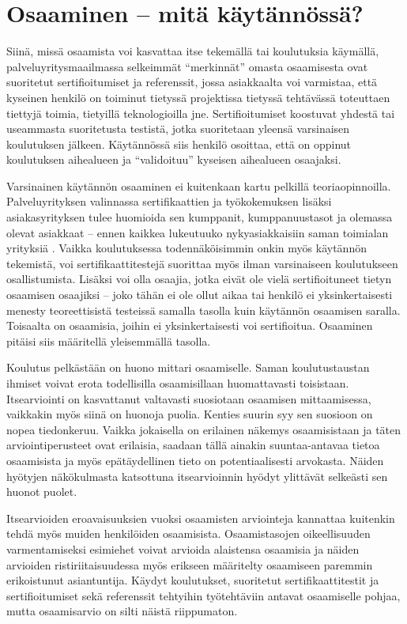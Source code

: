 \documentclass[a4paper,finnish,12pt]{article}
\begin{document}
\clearpage

\section{Osaaminen -- mitä käytännössä?}

Siinä, missä osaamista voi kasvattaa itse tekemällä tai koulutuksia käymällä, palveluyritysmaailmassa selkeimmät ``merkinnät'' omasta osaamisesta ovat suoritetut sertifioitumiset ja referenssit, jossa asiakkaalta voi varmistaa, että kyseinen henkilö on toiminut tietyssä projektissa tietyssä tehtävässä toteuttaen tiettyjä toimia, tietyillä teknologioilla jne. Sertifioitumiset koostuvat yhdestä tai useammasta suoritetusta testistä, jotka suoritetaan yleensä varsinaisen koulutuksen jälkeen. Käytännössä siis henkilö osoittaa, että on oppinut koulutuksen aihealueen ja ``validoituu'' kyseisen aihealueen osaajaksi.

Varsinainen käytännön osaaminen ei kuitenkaan kartu pelkillä teoriaopinnoilla. Palveluyrityksen valinnassa sertifikaattien ja työkokemuksen lisäksi asiakasyrityksen tulee huomioida sen kumppanit, kumppanuustasot ja olemassa olevat asiakkaat  -- ennen kaikkea lukeutuuko nykyasiakkaisiin saman toimialan yrityksiä \cite{ICT-haasteet}. Vaikka koulutuksessa todennäköisimmin onkin myös käytännön tekemistä, voi sertifikaattitestejä suorittaa myös ilman varsinaiseen koulutukseen osallistumista. Lisäksi voi olla osaajia, jotka eivät ole vielä sertifioituneet tietyn osaamisen osaajiksi -- joko tähän ei ole ollut aikaa tai henkilö ei yksinkertaisesti menesty teoreettisistä testeissä samalla tasolla kuin käytännön osaamisen saralla. Toisaalta on osaamisia, joihin ei yksinkertaisesti voi sertifioitua. Osaaminen pitäisi siis määritellä yleisemmällä tasolla.

Koulutus pelkästään on huono mittari osaamiselle. Saman koulutustaustan ihmiset voivat erota todellisilla osaamisillaan huomattavasti toisistaan. Itsearviointi on kasvattanut valtavasti suosiotaan osaamisen mittaamisessa, vaikkakin myös siinä on huonoja puolia. Kenties suurin syy sen suosioon on nopea tiedonkeruu. Vaikka jokaisella on erilainen näkemys osaamisistaan ja täten arviointiperusteet ovat erilaisia, saadaan tällä ainakin suuntaa-antavaa tietoa osaamisista ja myös epätäydellinen tieto on potentiaalisesti arvokasta. Näiden hyötyjen näkökulmasta katsottuna itsearvioinnin hyödyt ylittävät selkeästi sen huonot puolet. \cite{self-assessment_in_skill_measurement}

Itsearvioiden eroavaisuuksien vuoksi osaamisten arviointeja kannattaa kuitenkin tehdä myös muiden henkilöiden osaamisista. Osaamistasojen oikeellisuuden varmentamiseksi esimiehet voivat arvioida alaistensa osaamisia ja näiden arvioiden ristiriitaisuudessa myös erikseen määritelty osaamiseen paremmin erikoistunut asiantuntija. Käydyt koulutukset, suoritetut sertifikaattitestit ja sertifioitumiset sekä referenssit tehtyihin työtehtäviin antavat osaamiselle pohjaa, mutta osaamisarvio on silti näistä riippumaton.
\end{document}

